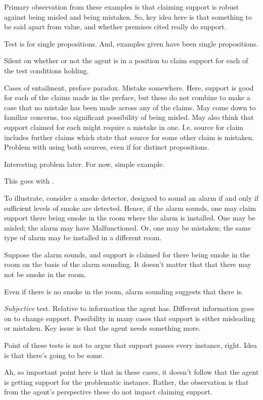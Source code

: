 \begin{note}
  Primary observation from these examples is that claiming support is robust against being misled and being mistaken.
  So, key idea here is that something to be said apart from value, and whether premises cited really do support.

  Test is for single propositions.
  And, examples given have been single propositions.

  Silent on whether or not the agent is in a position to claim support for each of the test conditions holding.

  Cases of entailment, preface paradox.
  Mistake somewhere.
  Here, support is good for each of the claims made in the preface, but these do not combine to make a case that no mistake has been made across any of the claims.
  May come down to familiar concerns, too significant possibility of being misled.
  May also think that support claimed for each might require a mistake in one.
  I.e. source for claim includes further claims which state that source for some other claim is mistaken.
  Problem with using both sources, even if for distinct propositions.

  Interesting problem later.
  For now, simple example.


  {
    This goes with \eit{}.

    To illustrate, consider a smoke detector, designed to sound an alarm if and only if sufficient levels of smoke are detected.
    Hence, if the alarm sounds, one may claim support there being smoke in the room where the alarm is installed.
    One may be misled; the alarm may have Malfunctioned.
    Or, one may be mistaken; the same type of alarm may be installed in a different room.

    Suppose the alarm sounds, and support is claimed for there being smoke in the room on the basis of the alarm sounding.
    It doesn't matter that that there may not be smoke in the room.

    Even if there is no smoke in the room, alarm sounding suggests that there is.
  }

  \emph{Subjective} test.
  Relative to information the agent has.
  Different information goes on to change support.
  Possibility in many cases that support is either misleading or mistaken.
  Key issue is that the agent needs something more.

  Point of these tests is not to argue that support passes every instance, right.
  Idea is that there's going to be some.

  Ah, so important point here is that in these cases, it doesn't follow that the agent is getting support for the problematic instance.
  Rather, the observation is that from the agent's perspective these do not impact claiming support.
\end{note}

